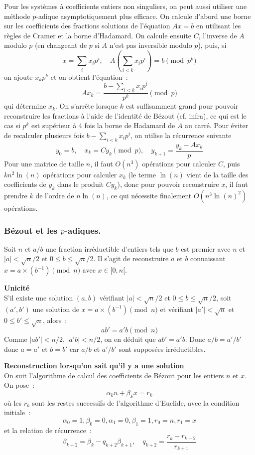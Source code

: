 \documentclass[a4paper,11pt]{article}
\begin{document}
\begin{giacjshere}
Pour les syst\`emes \`a coefficients entiers non singuliers, 
on peut aussi utiliser une m\'ethode $p$-adique asymptotiquement
plus efficace. On calcule d'abord une borne sur les
coefficients des fractions solutions de l'\'equation $Ax=b$
en utilisant les règles de Cramer et la borne d'Hadamard.
On calcule ensuite $C$, l'inverse de $A$ modulo $p$ (en changeant de $p$ si
$A$ n'est pas inversible modulo $p$), puis, si
\[ x=\sum_i x_i p^i, \quad A(\sum_{i<k} x_i p^i)=b \pmod{p^k} \]
on ajoute $x_k p^k $ et on obtient l'\'equation~:
\[ Ax_k = \frac{b-\sum_{i <k}  x_i p^i}{p^k} \pmod p \]
qui d\'etermine $x_k$.
On s'arr\^ete lorsque $k$ est suffisamment grand pour pouvoir reconstruire
les fractions \`a l'aide de l'identité de B\'ezout (cf. infra),
ce qui est le cas si $p^k$ est
sup\'erieur \`a 4 fois la borne de Hadamard de $A$ au carr\'e.
Pour \'eviter de recalculer plusieurs fois $b-\sum_{i <k}  x_i p^i$,
on utilise la r\'ecurrence suivante
\[ y_0=b, \quad x_{k}=Cy_k \pmod p, \quad y_{k+1} =
\frac{y_k-Ax_{k}}{p}\]
Pour une matrice de taille $n$, il faut $O(n^3)$ op\'erations
pour calculer $C$, puis $kn^2 \ln(n)$ op\'erations 
pour calculer $x_k$ (le terme $\ln(n)$ 
vient de la taille des coefficients
de $y_k$ dans le produit $Cy_k$),
donc pour pouvoir reconstruire $x$, il faut prendre $k$ de l'ordre
de $n\ln(n)$, ce qui n\'ecessite finalement $O(n^3\ln(n)^2)$ op\'erations.

\subsubsection{B\'ezout et les $p$-adiques.}
Soit $n$ et $a/b$ une fraction irr\'eductible d'entiers tels que 
$b$ est premier avec $n$ et $|a| < \sqrt{n}/2$ et $ 0 \leq b \leq \sqrt{n}/2$.
Il s'agit de reconstruire $a$ et $b$ connaissant 
$x=a \times (b^{-1}) \pmod n$ avec $x\in [0,n[$.

{\bf Unicit\'e}\\
S'il existe une solution $(a,b)$ vérifiant $|a| < \sqrt{n}/2$ et 
$ 0 \leq b \leq \sqrt{n}/2$, soit $(a',b')$ une solution
de $x=a \times (b^{-1}) \pmod n$ et 
vérifiant $|a'| < \sqrt{n}$ et $ 0 \leq b' \leq \sqrt{n}$, alors~:
\[ a b'=a' b \pmod n \]
Comme $|ab'| < n/2$, $|a'b| <n/2$, 
on en d\'eduit que $ab'=a'b$. Donc $a/b=a'/b'$
donc $a=a'$ et $b=b'$ car $a/b$ et $a'/b'$ sont suppos\'ees irr\'eductibles.

{\bf Reconstruction lorsqu'on sait qu'il y a une solution}\\
On suit l'algorithme de calcul des coefficients de B\'ezout
pour les entiers $n$ et $x$. On pose~:
\[ \alpha_k n + \beta_k x= r_k \]
o\`u les $r_k$ sont les restes successifs de l'algorithme d'Euclide,
avec la condition initiale~:
\[ \alpha_0=1, \beta_0=0, \alpha_1=0, \beta_1=1, r_0=n, r_1=x \]
et la relation de r\'ecurrence~:
\[ \beta_{k+2}=\beta_k - q_{k+2} \beta_{k+1}, \quad
q_{k+2}=\frac{r_{k}-r_{k+2}}{r_{k+1}}\]


\end{giacjshere}
\end{document}
